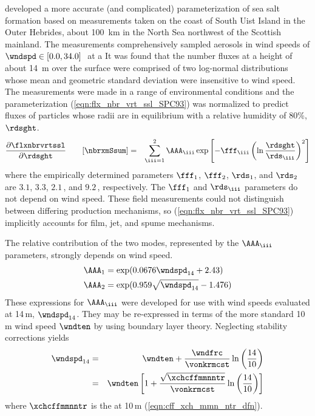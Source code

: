 \documentclass[12pt,twoside]{book}
\begin{document}
\cite{SPC93} developed a more accurate (and complicated)
parameterization of sea salt formation based on measurements taken on
the coast of South Uist Island in the Outer Hebrides, about 100~km
in the North Sea northwest of the Scottish mainland.
The measurements comprehensively sampled aerosols in wind speeds of
$\wndspd \in [0.0, 34.0]$\,\mxs\ at a 
It was found that the number fluxes at a height of about 14~m over the
surface were comprised of two log-normal distributions whose mean and
geometric standard deviation were insensitive to wind speed.
The measurements were made in a range of environmental conditions
and the parameterization (\ref{eqn:flx_nbr_vrt_ssl_SPC93}) was
normalized to predict fluxes of particles whose radii are in
equilibrium with a relative humidity of 80\%, $\rdsght$.
\begin{eqnarray}
\frac{\partial \flxnbrvrtssl}{\partial \rdsght} \qquad [\mbox{\nbrxmSsum}] & = &
\sum_{\iii = 1}^{2} \AAA_{\iii} 
\exp \left[ -\fff_{\iii} \left( \ln \frac{\rdsght}{\rds_{\iii}}
\right)^{2} \right]
\label{eqn:flx_nbr_vrt_ssl_SPC93}
\end{eqnarray}
where the empirically determined parameters $\fff_{1}$, $\fff_{2}$, 
$\rds_{1}$, and $\rds_{2}$ are $3.1$, $3.3$, $2.1$\,\um, and
$9.2$\,\um, respectively.
The $\fff_{1}$ and $\rds_{\iii}$ parameters do not depend on
wind speed.
These field measurements could not distinguish between differing
production mechanisms, so (\ref{eqn:flx_nbr_vrt_ssl_SPC93})
implicitly accounts for film, jet, and spume mechanisms.

The relative contribution of the two modes, represented by the
$\AAA_{\iii}$ parameters, strongly depends on wind speed.
\begin{subequations}
\label{eqn:cff_A_SPC93}
\begin{align}
\label{eqn:cff_A1_SPC93}
\AAA_{1} & = \exp( 0.0676\wndspd_{14} + 2.43 ) \\
\label{eqn:cff_A2_SPC93}
\AAA_{2} & = \exp( 0.959\sqrt{\wndspd_{14}} - 1.476 )
\end{align}
\end{subequations}
These expressions for $\AAA_{\iii}$ were developed for use with
wind speeds evaluated at 14\,m, $\wndspd_{14}$.
They may be re-expressed in terms of the more standard 10\,m wind
speed $\wndten$ by using boundary layer theory.
Neglecting stability corrections yields \cite[e.g.,][]{And98}
\begin{eqnarray}
\wndspd_{14} & = & \wndten + \frac{\wndfrc}{\vonkrmcst} 
\ln \left( \frac{14}{10} \right) \nonumber \\
& = & \wndten \left[ 1 + \frac{\sqrt{\xchcffmmnntr}}{\vonkrmcst}
\ln \left( \frac{14}{10} \right) \right]
\end{eqnarray}
where $\xchcffmmnntr$ is the 
 at 10\,m
(\ref{eqn:cff_xch_mmn_ntr_dfn}).
\end{document}
